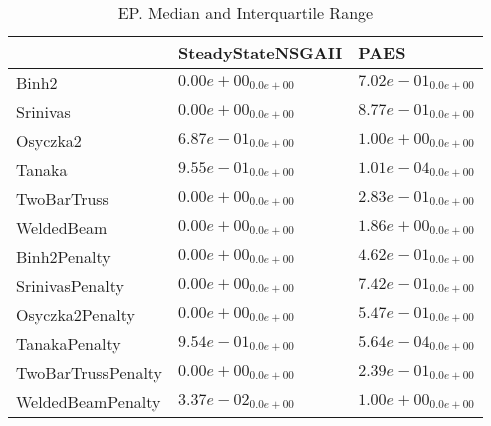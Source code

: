 \documentclass{article}
\begin{document}
\begin{table}
\caption{EP. Median and Interquartile Range}
\label{table: EP}
\centering
\begin{scriptsize}
\begin{tabular}{lll}
\hline & SteadyStateNSGAII &  PAES\\
\hline 
Binh2 & \cellcolor{gray95}$  0.00e+00_{ 0.0e+00}$ & \cellcolor{gray25}$  7.02e-01_{ 0.0e+00}$ \\
Srinivas & \cellcolor{gray95}$  0.00e+00_{ 0.0e+00}$ & \cellcolor{gray25}$  8.77e-01_{ 0.0e+00}$ \\
Osyczka2 & \cellcolor{gray95}$  6.87e-01_{ 0.0e+00}$ & \cellcolor{gray25}$  1.00e+00_{ 0.0e+00}$ \\
Tanaka & \cellcolor{gray25}$  9.55e-01_{ 0.0e+00}$ & \cellcolor{gray95}$  1.01e-04_{ 0.0e+00}$ \\
TwoBarTruss & \cellcolor{gray95}$  0.00e+00_{ 0.0e+00}$ & \cellcolor{gray25}$  2.83e-01_{ 0.0e+00}$ \\
WeldedBeam & \cellcolor{gray95}$  0.00e+00_{ 0.0e+00}$ & \cellcolor{gray25}$  1.86e+00_{ 0.0e+00}$ \\
Binh2Penalty & \cellcolor{gray95}$  0.00e+00_{ 0.0e+00}$ & \cellcolor{gray25}$  4.62e-01_{ 0.0e+00}$ \\
SrinivasPenalty & \cellcolor{gray95}$  0.00e+00_{ 0.0e+00}$ & \cellcolor{gray25}$  7.42e-01_{ 0.0e+00}$ \\
Osyczka2Penalty & \cellcolor{gray95}$  0.00e+00_{ 0.0e+00}$ & \cellcolor{gray25}$  5.47e-01_{ 0.0e+00}$ \\
TanakaPenalty & \cellcolor{gray25}$  9.54e-01_{ 0.0e+00}$ & \cellcolor{gray95}$  5.64e-04_{ 0.0e+00}$ \\
TwoBarTrussPenalty & \cellcolor{gray95}$  0.00e+00_{ 0.0e+00}$ & \cellcolor{gray25}$  2.39e-01_{ 0.0e+00}$ \\
WeldedBeamPenalty & \cellcolor{gray95}$  3.37e-02_{ 0.0e+00}$ & \cellcolor{gray25}$  1.00e+00_{ 0.0e+00}$ \\
\hline
\end{tabular}
\end{scriptsize}
\end{table}
\end{document}
